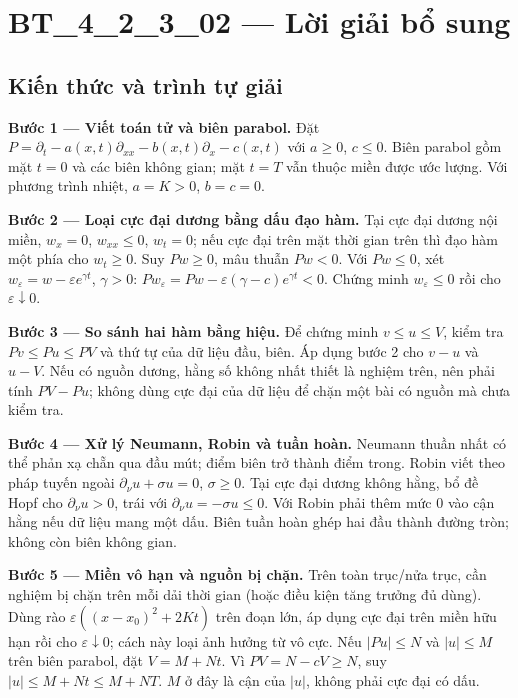 \documentclass[10pt,a4paper]{article}
\begin{document}
\section*{BT\_4\_2\_3\_02 — Lời giải bổ sung}
\subsection*{Kiến thức và trình tự giải}
\textbf{Bước 1 — Viết toán tử và biên parabol.} Đặt $P=\partial_t-a(x,t)\partial_{xx}-b(x,t)\partial_x-c(x,t)$ với $a\ge0$, $c\le0$. Biên parabol gồm mặt $t=0$ và các biên không gian; mặt $t=T$ vẫn thuộc miền được ước lượng. Với phương trình nhiệt, $a=K>0$, $b=c=0$.

\textbf{Bước 2 — Loại cực đại dương bằng dấu đạo hàm.} Tại cực đại dương nội miền, $w_x=0$, $w_{xx}\le0$, $w_t=0$; nếu cực đại trên mặt thời gian trên thì đạo hàm một phía cho $w_t\ge0$. Suy $Pw\ge0$, mâu thuẫn $Pw<0$. Với $Pw\le0$, xét $w_\varepsilon=w-\varepsilon e^{\gamma t}$, $\gamma>0$: $Pw_\varepsilon=Pw-\varepsilon(\gamma-c)e^{\gamma t}<0$. Chứng minh $w_\varepsilon\le0$ rồi cho $\varepsilon\downarrow0$.

\textbf{Bước 3 — So sánh hai hàm bằng hiệu.} Để chứng minh $v\le u\le V$, kiểm tra $Pv\le Pu\le PV$ và thứ tự của dữ liệu đầu, biên. Áp dụng bước 2 cho $v-u$ và $u-V$. Nếu có nguồn dương, hằng số không nhất thiết là nghiệm trên, nên phải tính $PV-Pu$; không dùng cực đại của dữ liệu để chặn một bài có nguồn mà chưa kiểm tra.

\textbf{Bước 4 — Xử lý Neumann, Robin và tuần hoàn.} Neumann thuần nhất có thể phản xạ chẵn qua đầu mút; điểm biên trở thành điểm trong. Robin viết theo pháp tuyến ngoài $\partial_\nu u+\sigma u=0$, $\sigma\ge0$. Tại cực đại dương không hằng, bổ đề Hopf cho $\partial_\nu u>0$, trái với $\partial_\nu u=-\sigma u\le0$. Với Robin phải thêm mức $0$ vào cận hằng nếu dữ liệu mang một dấu. Biên tuần hoàn ghép hai đầu thành đường tròn; không còn biên không gian.

\textbf{Bước 5 — Miền vô hạn và nguồn bị chặn.} Trên toàn trục/nửa trục, cần nghiệm bị chặn trên mỗi dải thời gian (hoặc điều kiện tăng trưởng đủ dùng). Dùng rào $\varepsilon((x-x_0)^2+2Kt)$ trên đoạn lớn, áp dụng cực đại trên miền hữu hạn rồi cho $\varepsilon\downarrow0$; cách này loại ảnh hưởng từ vô cực. Nếu $|Pu|\le N$ và $|u|\le M$ trên biên parabol, đặt $V=M+Nt$. Vì $PV=N-cV\ge N$, suy $|u|\le M+Nt\le M+NT$. $M$ ở đây là cận của $|u|$, không phải cực đại có dấu.
\end{document}
